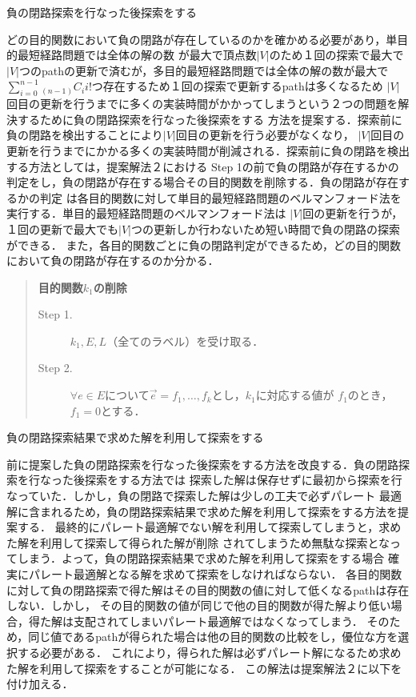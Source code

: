 \documentclass[12pt]{optlab-bachelor}
\begin{document}
\begin{description}
  \item[負の閉路探索を行なった後探索をする]
\end{description}

どの目的関数において負の閉路が存在しているのかを確かめる必要があり，単目的最短経路問題では全体の解の数
が最大で頂点数$|V|$のため１回の探索で最大で$|V|$つのpathの更新で済むが，多目的最短経路問題では全体の解の数が最大で
$\displaystyle \sum_{i=0}^{n-1} {}_{(n-1)}C_i i!$つ存在するため１回の探索で更新するpathは多くなるため
$|V|$回目の更新を行うまでに多くの実装時間がかかってしまうという２つの問題を解決するために負の閉路探索を行なった後探索をする
方法を提案する．探索前に負の閉路を検出することにより$|V|$回目の更新を行う必要がなくなり，
$|V|$回目の更新を行うまでにかかる多くの実装時間が削減される．探索前に負の閉路を検出する方法としては，提案解法２における
Step 1の前で負の閉路が存在するかの判定をし，負の閉路が存在する場合その目的関数を削除する．負の閉路が存在するかの判定
は各目的関数に対して単目的最短経路問題のベルマンフォード法を実行する．単目的最短経路問題のベルマンフォード法は
$|V|$回の更新を行うが，１回の更新で最大でも$|V|$つの更新しか行わないため短い時間で負の閉路の探索ができる．
また，各目的関数ごとに負の閉路判定ができるため，どの目的関数において負の閉路が存在するのか分かる．


\begin{quote}
  \textbf{目的関数$k_1$の削除}
  \begin{description}
    \item[Step 1.] $k_1,E,L$（全てのラベル）を受け取る．
    \item[Step 2.] $\forall e \in E$について$\vec{e}={f_1,\ldots,f_k}$とし，$k_1$に対応する値が
    $f_1$のとき，$f_1=0$とする．
  \end{description}
\end{quote}

\begin{description}
  \item[負の閉路探索結果で求めた解を利用して探索をする]
\end{description}

前に提案した負の閉路探索を行なった後探索をする方法を改良する．負の閉路探索を行なった後探索をする方法では
探索した解は保存せずに最初から探索を行なっていた．しかし，負の閉路で探索した解は少しの工夫で必ずパレート
最適解に含まれるため，負の閉路探索結果で求めた解を利用して探索をする方法を提案する．
最終的にパレート最適解でない解を利用して探索してしまうと，求めた解を利用して探索して得られた解が削除
されてしまうため無駄な探索となってしまう．よって，負の閉路探索結果で求めた解を利用して探索をする場合
確実にパレート最適解となる解を求めて探索をしなければならない．
各目的関数に対して負の閉路探索で得た解はその目的関数の値に対して低くなるpathは存在しない．しかし，
その目的関数の値が同じで他の目的関数が得た解より低い場合，得た解は支配されてしまいパレート最適解ではなくなってしまう．
そのため，同じ値であるpathが得られた場合は他の目的関数の比較をし，優位な方を選択する必要がある．
これにより，得られた解は必ずパレート解になるため求めた解を利用して探索をすることが可能になる．
この解法は提案解法２に以下を付け加える．
\end{document}
